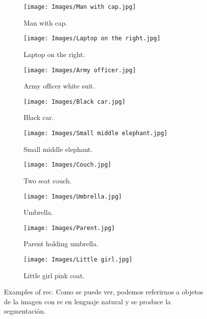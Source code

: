 \begin{figure}[tp]
  \centering
  \begin{subfigure}[t]{.32\textwidth}
    \centering
    \caption{Man with cap.} \label{fig:rec-man}
    \texttt{[image: Images/Man with cap.jpg]}
  \end{subfigure}\hfill
  \begin{subfigure}[t]{.32\textwidth}
    \centering
    \caption{Laptop on the right.} \label{fig:rec-laptop}
    \texttt{[image: Images/Laptop on the right.jpg]}
  \end{subfigure}\hfill
  \begin{subfigure}[t]{.32\textwidth}
    \centering
    \caption{Army officer white suit.} \label{fig:rec-army}
    \texttt{[image: Images/Army officer.jpg]}
  \end{subfigure}

  \bigskip
  \begin{subfigure}[t]{.32\textwidth}
    \centering
    \caption{Black car.} \label{fig:rec-car}
    \texttt{[image: Images/Black car.jpg]}
  \end{subfigure}\hfill
  \begin{subfigure}[t]{.32\textwidth}
    \centering
    \caption{Small middle elephant.} \label{fig:rec-elephant}
    \texttt{[image: Images/Small middle elephant.jpg]}
  \end{subfigure}\hfill
  \begin{subfigure}[t]{.32\textwidth}
    \centering
    \caption{Two seat couch.} \label{fig:rec-couch}
    \texttt{[image: Images/Couch.jpg]}
  \end{subfigure}

  \bigskip
  \begin{subfigure}[t]{.32\textwidth}
    \centering
    \caption{Umbrella.} \label{fig:rec-umbrella}
    \texttt{[image: Images/Umbrella.jpg]}
  \end{subfigure}\hfill
  \begin{subfigure}[t]{.32\textwidth}
    \centering
    \caption{Parent holding umbrella.} \label{fig:rec-parent}
    \texttt{[image: Images/Parent.jpg]}
  \end{subfigure}\hfill
  \begin{subfigure}[t]{.32\textwidth}
    \centering
    \caption{Little girl pink coat.} \label{fig:rec-girl}
    \texttt{[image: Images/Little girl.jpg]}
  \end{subfigure}
  \caption[Examples of \acl*{rec}]{Examples of \acl{rec}. Como se puede ver,
    podemos referirnos a objetos de la imagen con \gls{re} en lenguaje natural
    y se produce la segmentación.}
  \label{fig:rec-examples}
\end{figure}


